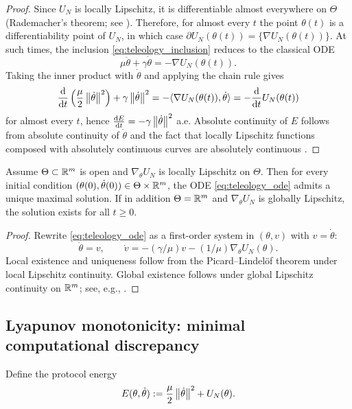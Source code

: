 \begin{proof}
Since $U_N$ is locally Lipschitz, it is differentiable almost everywhere on $\Theta$ (Rademacher's theorem; see \cite{Clarke1990}).
Therefore, for almost every $t$ the point $\theta(t)$ is a differentiability point of $U_N$, in which case $\partial U_N(\theta(t))=\{\nabla U_N(\theta(t))\}$.
At such times, the inclusion \eqref{eq:teleology_inclusion} reduces to the classical ODE
\[
\mu\ddot\theta+\gamma\dot\theta=-\nabla U_N(\theta(t)).
\]
Taking the inner product with $\dot\theta$ and applying the chain rule gives
\[
\frac{\mathrm{d}}{\mathrm{d} t}\left(\frac{\mu}{2}\left\lVert \dot\theta\right\rVert^2\right)+\gamma\left\lVert \dot\theta\right\rVert^2
=-\langle\nabla U_N(\theta(t)),\dot\theta\rangle
=-\frac{\mathrm{d}}{\mathrm{d} t}U_N(\theta(t))
\]
for almost every $t$, hence $\frac{\mathrm{d} E}{\mathrm{d} t}=-\gamma\left\lVert \dot\theta\right\rVert^2$ a.e.
Absolute continuity of $E$ follows from absolute continuity of $\dot\theta$ and the fact that locally Lipschitz functions composed with absolutely continuous curves are absolutely continuous \cite{Clarke1990}.
\end{proof}

\begin{proposition}
\label{prop:wellposedness}
Assume $\Theta\subset\mathbb{R}^m$ is open and $\nabla_\theta U_N$ is locally Lipschitz on $\Theta$.
Then for every initial condition $(\theta(0),\dot\theta(0))\in \Theta\times\mathbb{R}^m$, the ODE \eqref{eq:teleology_ode} admits a unique maximal solution.
If in addition $\Theta=\mathbb{R}^m$ and $\nabla_\theta U_N$ is globally Lipschitz, the solution exists for all $t\ge 0$.
\end{proposition}

\begin{proof}
Rewrite \eqref{eq:teleology_ode} as a first-order system in $(\theta,v)$ with $v=\dot\theta$:
\[
\dot\theta=v,\qquad
\dot v=-(\gamma/\mu)v-(1/\mu)\nabla_\theta U_N(\theta).
\]
Local existence and uniqueness follow from the Picard--Lindel\"of theorem under local Lipschitz continuity.
Global existence follows under global Lipschitz continuity on $\mathbb{R}^m$; see, e.g., \cite[Chapter~1]{CoddingtonLevinson1955}.
\end{proof}

\subsection{Lyapunov monotonicity: minimal computational discrepancy}
\label{sec:lyapunov}

Define the protocol energy
\begin{equation}
\label{eq:energy_def}
E(\theta,\dot\theta)
:=
\frac{\mu}{2}\left\lVert \dot\theta\right\rVert^2
+
U_N(\theta).
\end{equation}


